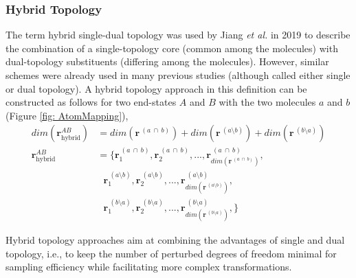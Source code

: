\subsubsection{Hybrid Topology}
The term hybrid single-dual topology was used by Jiang \textit{et al.}\cite{Jiang2019} in 2019 to describe the combination of a single-topology core (common among the molecules) with dual-topology substituents (differing among the molecules). However, similar schemes were already used in many previous studies (although called either single or dual topology).\cite{Eriksson1995,Shobana2000, Gapsys2015, Petrov2021, Seeliger2010, Riniker2011}
%
A hybrid topology approach in this definition can be constructed as follows for two end-states $A$ and $B$ with the two molecules $a$ and $b$ (Figure \ref{fig: AtomMapping}),
\begin{align*}
    dim(\textbf{r}_{\text{hybrid}}^{AB}) &= dim(\textbf{r}^{~(a~\cap~b)}) + dim(\textbf{r}^{~(a \setminus b)}) + dim(\textbf{r}^{~(b \setminus a)})\\
    \textbf{r}^{AB}_{\text{hybrid}} &= \{\textbf{r}^{~(a~\cap~b)}_{1}, \textbf{r}^{~(a~\cap~b)}_{2}, ..., \textbf{r}^{~(a~\cap~b)}_{dim(\textbf{r}^{~(a~\cap~b)})}, \\
    &~~~\textbf{r}^{~(a \setminus b)}_{1}, \textbf{r}^{~(a \setminus b)}_{2}, ..., \textbf{r}^{~(a \setminus b)}_{dim(\textbf{r}^{~(a \setminus b)})}, \\
    &~~~\textbf{r}^{~(b \setminus a)}_{1}, \textbf{r}^{~(b \setminus a)}_{2}, ..., \textbf{r}^{~(b \setminus a)}_{dim(\textbf{r}^{~(b \setminus a)})}, \}
\end{align*}
 
Hybrid topology approaches aim at combining the advantages of single and dual topology, i.e., to keep the number of perturbed degrees of freedom minimal for sampling efficiency while facilitating more complex transformations.

